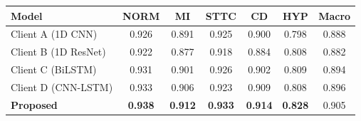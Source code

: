 \begin{tabular}{@{}lccccc|c@{}}
\toprule
Model & NORM & MI & STTC & CD & HYP & Macro \\
\midrule
Client A (1D CNN) & 0.926 & 0.891 & 0.925 & 0.900 & 0.798 & 0.888 \\
Client B (1D ResNet) & 0.922 & 0.877 & 0.918 & 0.884 & 0.808 & 0.882 \\
Client C (BiLSTM) & 0.931 & 0.901 & 0.926 & 0.902 & 0.809 & 0.894 \\
Client D (CNN-LSTM) & 0.933 & 0.906 & 0.923 & 0.909 & 0.808 & 0.896 \\
\textbf{Proposed} & \textbf{0.938} & \textbf{0.912} & \textbf{0.933} & \textbf{0.914} & \textbf{0.828} & 0.905 \\
\bottomrule
\end{tabular}
